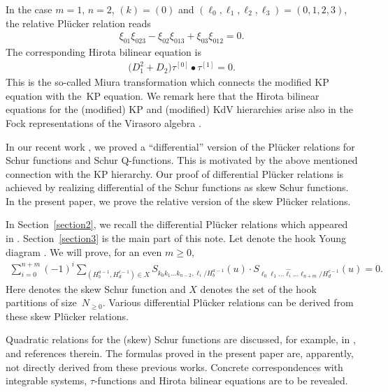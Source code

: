 \documentclass[pdftex]{sigma}
\numberwithin{equation}{section}
\begin{document}
In the case $m=1$, $n=2$, $(k) = (0)$ and $(\ell_0,\ell_1, \ell_2, \ell_3) = (0,1,2,3)$, the relative Pl\"ucker relation reads
\begin{gather*}
\xi_{01}\xi_{023} - \xi_{02}\xi_{013} + \xi_{03}\xi_{012} = 0.
\end{gather*}
The corresponding Hirota bilinear equation is
\begin{gather*}
\bigl(D_1^2 + D_2\bigr) \tau^{[0]}\bullet \tau^{[1]} = 0.
\end{gather*}
This is the so-called Miura transformation which connects the modified KP equation with the~KP equation.
We remark here that the Hirota bilinear equations for the (modified) KP and (modified) KdV hierarchies arise also in the Fock representations of the Virasoro algebra \cite{asy1,asy2}.

In our recent work \cite{asy3}, we proved a ``differential'' version of the Pl\"ucker relations for Schur functions and Schur Q-functions.
This is motivated by the above mentioned connection with the KP hierarchy. Our proof of differential Pl\"ucker relations is achieved by realizing differential of the Schur functions as skew Schur functions. In the present paper, we prove the relative version of the skew Pl\"ucker relations.



In Section~\ref{section2}, we recall the differential Pl\"ucker relations which appeared in \cite{asy3}.
Section~\ref{section3} is the main part of this note.
Let  denote the hook Young diagram . We will prove, for an even $m\geq 0$,
\begin{gather*}
\sum_{i=0}^{n+m}{(-1)}^{i}\sum_{(H^{a-1}_{b},H^{c-1}_{d})\in X}S_{k_0k_1\dots k_{n-2},\ell_i/H^{a-1}_{b}}(u)\cdot S_{\ell_0\ell_1\dots\widehat{\ell_i}\dots\ell_{n+m}/H^{c-1}_{d}}(u)=0.
\end{gather*}
Here  denotes the skew Schur function and $X$ denotes the set of the hook partitions of size~$N_{\geq0}$. Various differential Pl\"ucker relations can be derived from these skew Pl\"ucker relations.

Quadratic relations for the (skew) Schur functions are discussed, for example, in \cite{bbt, g, hb}, and references therein.
The formulas proved in the present paper are, apparently, not directly derived from these previous works.
Concrete correspondences with integrable systems, $\tau$-functions and Hirota bilinear equations are to be revealed.
\end{document}

